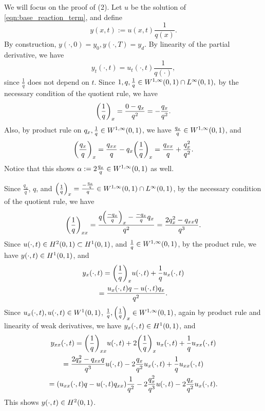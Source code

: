 \documentclass{ifacconf}
\begin{document}
\begin{thm}
\begin{pf}
We will focus on the proof of (2). 
Let $u$ be the solution of \eqref{eqn:base_reaction_term}, and define $$y(x, t) := u(x, t)\frac{1}{q(x)}.$$
By construction, $y(\cdot, 0) = y_0, y(\cdot, T) = y_d$.
By linearity of the partial derivative, we have $$y_t(\cdot, t) = u_t(\cdot, t)\frac{1}{q(\cdot)},$$
    since $\frac{1}{q}$ does not depend on $t$.
    Since $1, q, \frac{1}{q} \in {W^{1, \infty}_{}{\left ( 0,1 \right )}} \cap {L^{\infty}_{}{\left ( 0,1 \right )}},$ by the necessary condition of the quotient rule, we have $${\left ( \frac{1}{q} \right )}_x = \frac{0 - q_x}{q^2} = -\frac{q_x}{q^2}.$$ 
    Also, by product rule on $q_x, \frac{1}{q} \in {W^{1, \infty}_{}{\left ( 0,1 \right )}}$, we have $\frac{q_x}{q} \in {W^{1, \infty}_{}{\left ( 0,1 \right )}}$, and $${\left ( \frac{q_x}{q} \right )}_x = \frac{q_{xx}}{q} - q_x{\left ( \frac{1}{q} \right )}_x = \frac{q_{xx}}{q} + \frac{q_x^2}{q^2}.$$
    Notice that this shows $\alpha := 2\frac{q_x}{q} \in {W^{1, \infty}_{}{\left ( 0,1 \right )}}$ as well.
    
    Since $\frac{q_x}{q}$, $q$, and ${\left ( \frac{1}{q} \right )}_x = \frac{-\frac{q_x}{q}}{q} \in {W^{1, \infty}_{}{\left ( 0,1 \right )}} \cap {L^{\infty}_{}{\left ( 0,1 \right )}}$, by the necessary condition of the quotient rule, we have
    \begin{equation*}
        {\left ( \frac{1}{q} \right )}_{xx} = \frac{q{\left ( \frac{-q_x}{q} \right )}_x - \frac{-q_x}{q}q_x}{q^2}
        = \frac{2q_x^2-q_{xx}q}{q^3}.
    \end{equation*}
    Since $u(\cdot, t) \in {H^{2}_{}{\left ( 0,1 \right )}} \subset {H^{1}_{}{\left ( 0,1 \right )}}$, and $\frac{1}{q} \in {W^{1, \infty}_{}{\left ( 0,1 \right )}}$, by the product rule, we have $y(\cdot, t) \in {H^{1}_{}{\left ( 0,1 \right )}}$, and
    \begin{multline*}
        y_x(\cdot, t) = {\left ( \frac{1}{q} \right )}_xu(\cdot, t) + \frac{1}{q}u_x(\cdot, t)\\
        = \frac{u_x(\cdot, t)q - u(\cdot, t)q_x}{q^2}.
    \end{multline*}
    Since $u_x(\cdot, t), u(\cdot, t) \in {W^{1}_{}{\left ( 0,1 \right )}}$, $\frac{1}{q}, {\left ( \frac{1}{q} \right )}_x \in {W^{1, \infty}_{}{\left ( 0,1 \right )}}$, again by product rule and linearity of weak derivatives, we have $y_x(\cdot, t) \in {H^{1}_{}{\left ( 0,1 \right )}}$, and 
    \begin{multline*}        
        y_{xx}(\cdot, t) 
        = {\left ( \frac{1}{q} \right )}_{xx}u(\cdot, t) + 2{\left ( \frac{1}{q} \right )}_xu_x(\cdot, t) + \frac{1}{q}u_{xx}(\cdot, t)\\
        = \frac{2q_x^2-q_{xx}q}{q^3}u(\cdot, t) - 2\frac{q_x}{q^2}u_x(\cdot, t) + \frac{1}{q}u_{xx}(\cdot, t)\\
        = {\left ( u_{xx}(\cdot, t)q - u(\cdot, t)q_{xx} \right )}\frac{1}{q^2} - 2\frac{q_x^2}{q^3}u(\cdot, t) - 2\frac{q_x}{q^2}u_x(\cdot, t).
    \end{multline*}
    This shows $y(\cdot, t) \in {H^{2}_{}{\left ( 0,1 \right )}}$.
    

\end{pf}
\end{thm}
\end{document}
